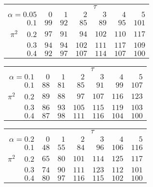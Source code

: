 \begin{tabular}{r|rrrrrr}
\hline\hline
 &\multicolumn{6}{c}{$\tau$} \\ 
 $\alpha = 0.05$ & $0$ & $1$ & $2$ & $3$ & $4$ & $5$ \\ 
 \hline$0.1$ & $ 99$ & $ 92$ & $ 85$ & $ 89$ & $ 95$ & $101$\\ 
$\pi^2\;\;\;$ $0.2$ & $ 97$ & $ 91$ & $ 94$ & $102$ & $110$ & $117$\\ 
$0.3$ & $ 94$ & $ 94$ & $102$ & $111$ & $117$ & $109$\\ 
$0.4$ & $ 92$ & $ 97$ & $107$ & $114$ & $107$ & $100$\\ 
 \hline 
 \end{tabular}
 
 \vspace{2em} 
 
\begin{tabular}{r|rrrrrr}
\hline\hline
 &\multicolumn{6}{c}{$\tau$} \\ 
 $\alpha = 0.1$ & $0$ & $1$ & $2$ & $3$ & $4$ & $5$ \\ 
 \hline$0.1$ & $ 88$ & $ 81$ & $ 85$ & $ 91$ & $ 99$ & $107$\\ 
$\pi^2\;\;\;$ $0.2$ & $ 89$ & $ 88$ & $ 97$ & $107$ & $116$ & $123$\\ 
$0.3$ & $ 86$ & $ 93$ & $105$ & $115$ & $119$ & $103$\\ 
$0.4$ & $ 87$ & $ 98$ & $111$ & $116$ & $104$ & $100$\\ 
 \hline 
 \end{tabular}
 
 \vspace{2em} 
 
\begin{tabular}{r|rrrrrr}
\hline\hline
 &\multicolumn{6}{c}{$\tau$} \\ 
 $\alpha = 0.2$ & $0$ & $1$ & $2$ & $3$ & $4$ & $5$ \\ 
 \hline$0.1$ & $ 48$ & $ 55$ & $ 84$ & $ 96$ & $106$ & $116$\\ 
$\pi^2\;\;\;$ $0.2$ & $ 65$ & $ 80$ & $101$ & $114$ & $125$ & $117$\\ 
$0.3$ & $ 74$ & $ 90$ & $111$ & $123$ & $112$ & $101$\\ 
$0.4$ & $ 80$ & $ 97$ & $116$ & $115$ & $102$ & $100$\\ 
 \hline 
 \end{tabular}